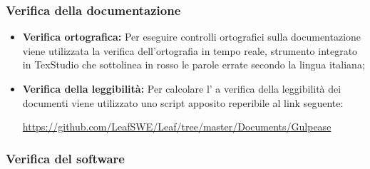 \documentclass[../NormediProgetto.tex]{subfiles}
\begin{document}
	\subsubsection{Verifica della documentazione}
	
	\begin{itemize}
		\item \textbf{Verifica ortografica:} Per eseguire controlli ortografici sulla documentazione viene utilizzata la verifica dell’ortografia in tempo reale, strumento integrato in TexStudio che sottolinea in rosso le parole errate secondo la lingua italiana;
		
		\item \textbf{Verifica della leggibilità:} Per calcolare l' a verifica della leggibilità dei documenti viene utilizzato uno script apposito reperibile al link seguente:
		
		\begin{center}
			\centerline{\url{https://github.com/LeafSWE/Leaf/tree/master/Documents/Gulpease}}
		\end{center}
	\end{itemize}
	
	\subsubsection{Verifica del software}
	
\end{document}

